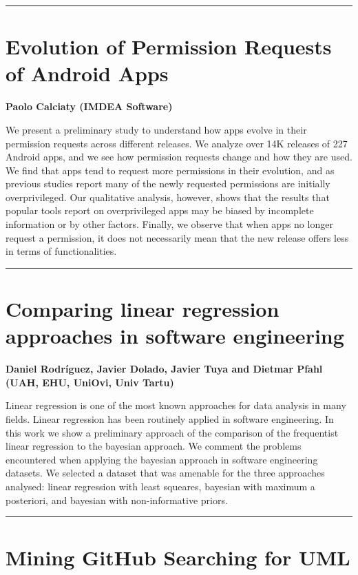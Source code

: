 \documentclass[11pt,pressrelease]{newlfm} %
\begin{document}
\begin{newlfm}
\rule{\textwidth}{1pt} \par \noindent
\section{Evolution of Permission Requests of Android Apps}

{\bf Paolo Calciaty (IMDEA Software)}

We present a preliminary study to understand how apps evolve in their permission requests across different releases. We analyze over 14K releases of 227 Android apps, and we see how permission requests change and how they are used. We find that apps tend to request more permissions in their evolution, and as previous studies report many of the newly requested permissions are initially overprivileged. Our qualitative analysis, however, shows that the results that popular tools report on overprivileged apps may be biased by incomplete information or by other factors. Finally, we observe that when apps no longer request a permission, it does not necessarily mean that the new release offers less in terms of functionalities.


\rule{\textwidth}{1pt} \par \noindent
\section{Comparing linear regression approaches in software engineering}

{\bf Daniel Rodr\'iguez, Javier Dolado, Javier Tuya and Dietmar Pfahl (UAH, EHU, UniOvi, Univ Tartu)}

Linear regression is one of the most known approaches for data analysis in many fields. Linear regression has been routinely applied in software engineering.
In this work we show a preliminary approach of the comparison of the frequentist linear regression to the bayesian approach. We comment the problems encountered when applying the bayesian approach in software engineering datasets. We selected a dataset that was amenable for the three approaches analysed: linear regression with least squeares, bayesian with maximum a posteriori, and bayesian with non-informative priors. 


\rule{\textwidth}{1pt} \par \noindent
\section{Mining GitHub Searching for UML}


\end{newlfm}
\end{document}
